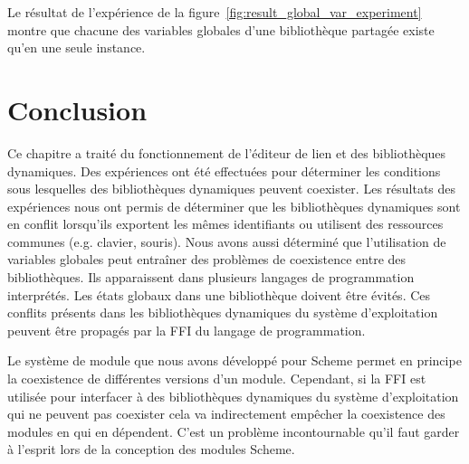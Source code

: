 Le résultat de l'expérience de la figure~\ref{fig:result_global_var_experiment} montre
que chacune des variables globales d'une bibliothèque partagée existe qu'en une seule
instance.





\section{Conclusion}
%
Ce chapitre a traité du fonctionnement de l'éditeur de lien et des
bibliothèques dynamiques. Des expériences ont été effectuées pour déterminer
les conditions sous lesquelles des bibliothèques dynamiques peuvent
coexister. Les résultats des expériences nous ont permis de déterminer
que les bibliothèques dynamiques sont en conflit lorsqu'ils exportent
les mêmes identifiants ou utilisent des ressources communes (e.g. clavier,
souris).
Nous avons aussi déterminé que l'utilisation de variables globales peut entraîner
des problèmes de coexistence entre des bibliothèques. Ils apparaissent dans
plusieurs langages de programmation interprétés. Les états globaux dans
une bibliothèque doivent être évités.
Ces conflits présents dans les bibliothèques dynamiques
du système d'exploitation peuvent être propagés par la FFI du langage
de programmation.

Le système de module que nous avons développé pour Scheme permet en principe la
coexistence de différentes versions d'un module. Cependant, si la FFI est utilisée
pour interfacer à des bibliothèques dynamiques du système d'exploitation qui
ne peuvent pas coexister cela va indirectement empêcher la coexistence des modules en
qui en dépendent. C'est un problème incontournable qu'il faut garder à l'esprit
lors de la conception des modules Scheme.


